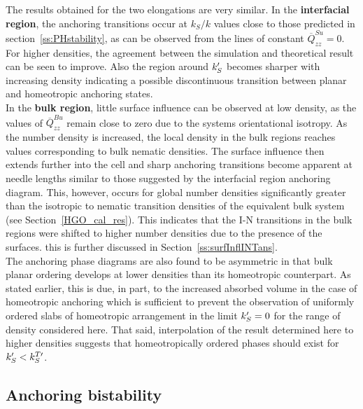 The results obtained for the two elongations are very similar. In the \textbf{interfacial
region}, the anchoring transitions occur at $k_S/k$ values close to those predicted in 
section~\ref{ss:PHstability}, as can be observed from the lines of constant $\overline{Q}^{Su}_{zz} =
0$. For higher densities, the agreement between  the simulation and theoretical result can be
seen to improve. 
Also the region around $k_S^{\prime}$ becomes sharper with increasing density indicating a 
possible discontinuous transition between planar and homeotropic anchoring states.\\

In the \textbf{bulk region}, little surface influence can be observed at low density, as
the values of $\overline{Q}^{Bu}_{zz}$ remain close to zero due to the systems orientational
isotropy. As the number density is increased,  the local density in the bulk 
regions reaches values corresponding to bulk nematic densities. The surface influence then extends 
further into the cell and sharp anchoring transitions become apparent at needle lengths similar to
those suggested by the interfacial region anchoring diagram.
This, however, occurs for global number densities significantly greater than the isotropic to nematic
transition densities of the equivalent bulk system (see Section~\ref{HGO_cal_res}).
This indicates that the I-N transitions in the bulk regions
were shifted to higher number densities due to the presence of the surfaces. this is further
discussed in Section~\ref{ss:surfInflINTans}.\\

The anchoring phase diagrams are also found to be asymmetric in that bulk
planar ordering develops at lower densities than its homeotropic counterpart. 
As stated earlier, this is due, in part, to the increased absorbed volume in the case of
homeotropic anchoring which is sufficient to prevent the observation of uniformly 
ordered slabs of homeotropic arrangement in the limit $k_S^{\prime}=0$ for the range of density 
considered here. That said, interpolation of the result determined here to higher densities
suggests that homeotropically ordered phases should exist for $k_S^{\prime} < k^{T\prime}_{S}$.

\subsection{Anchoring bistability}

